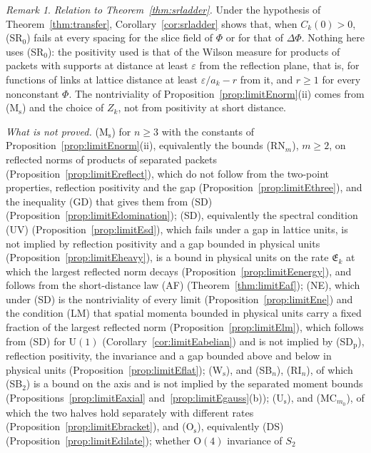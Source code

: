 \documentclass[aps,prd,twocolumn,superscriptaddress,nofootinbib,longbibliography,floatfix,amsmath,amssymb,10pt]{revtex4-2}
\theoremstyle{definition}
\theoremstyle{remark}
\newtheorem{remark}[theorem]{Remark}
\newcommand{\U}{\mathrm{U}}
\begin{document}
\begin{remark}
\emph{Relation to Theorem~\ref{thm:srladder}.} Under the hypothesis of
Theorem~\ref{thm:transfer}, Corollary~\ref{cor:srladder} shows that, when
$C_k(0)>0$, (SR$_0$) fails at every spacing for the slice field of $\Phi$
or for that of $\Delta\Phi$. Nothing here
uses (SR$_0$): the positivity used is that of the Wilson measure for
products of packets with supports at distance at least $\varepsilon$ from
the reflection plane, that is, for functions of links at lattice distance at
least $\varepsilon/a_k-r$ from it, and $r\ge1$ for every nonconstant
$\Phi$. The nontriviality of Proposition~\ref{prop:limitEnorm}(ii) comes
from (M$_{\mathrm s}$) and the choice of $Z_k$, not from positivity at short
distance.

\emph{What is not proved.} (M$_{\mathrm s}$) for $n\ge3$ with the constants
of Proposition~\ref{prop:limitEnorm}(ii), equivalently the bounds (RN$_m$),
$m\ge2$, on reflected norms of products of separated packets
(Proposition~\ref{prop:limitEreflect}), which do not follow from the
two-point properties, reflection positivity and the gap
(Proposition~\ref{prop:limitEthree}), and the inequality (GD) that gives them
from (SD) (Proposition~\ref{prop:limitEdomination}); (SD), equivalently the spectral
condition (UV) (Proposition~\ref{prop:limitEsd}), which fails under a gap in
lattice units, is not implied by reflection positivity and a gap bounded
in physical units (Proposition~\ref{prop:limitEheavy}), is a bound in
physical units on the rate $\mathfrak E_k$ at which the largest reflected
norm decays (Proposition~\ref{prop:limitEenergy}), and follows from the
short-distance law (AF) (Theorem~\ref{thm:limitEaf}); (NE), which under (SD) is the
nontriviality of every limit (Proposition~\ref{prop:limitEne}) and the
condition (LM) that spatial momenta bounded in physical units carry a fixed
fraction of the largest reflected norm (Proposition~\ref{prop:limitElm}),
which follows from (SD) for $\U(1)$ (Corollary~\ref{cor:limitEabelian}) and
is not implied by (SD$_{\mathrm p}$), reflection positivity, the invariance
and a gap bounded above and below in physical units
(Proposition~\ref{prop:limitEflat});
(W$_{\mathrm s}$), and (SB$_n$), (RI$_n$), of which (SB$_2$) is a bound on
the axis and is not implied by the separated moment bounds
(Propositions~\ref{prop:limitEaxial} and~\ref{prop:limitEgauss}(b));
(U$_{\mathrm s}$), and (MC$_{m_0}$), of which the two halves hold separately
with different rates (Proposition~\ref{prop:limitEbracket}), and
(O$_{\mathrm s}$), equivalently (DS) (Proposition~\ref{prop:limitEdilate});
whether $\mathrm O(4)$ invariance of $S_2$

\end{remark}
\end{document}
